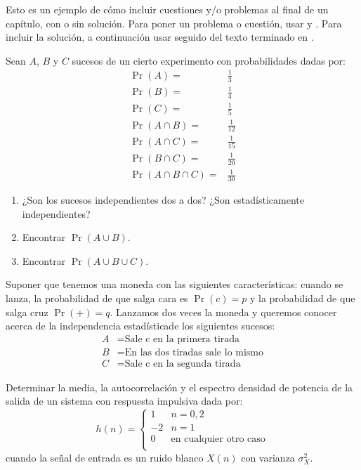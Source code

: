 \noindent Esto es un ejemplo de cómo incluir cuestiones y/o problemas al final de un capítulo, con o sin solución. Para poner un problema o cuestión, usar   y . Para incluir la solución, a continuación usar  seguido del texto terminado en .

\begin{prob}
Sean $A$, $B$ y $C$ sucesos de un cierto experimento con probabilidades dadas por:
\begin{align*}
\Pr\left( {A} \right)=&\frac{1}{3}\\
\Pr\left( {B} \right)=&\frac{1}{4}\\
\Pr\left( {C} \right)=&\frac{1}{5}\\
\Pr\left( {A\cap B} \right)=&\frac{1}{12}\\
\Pr\left( {A\cap C} \right)=&\frac{1}{15}\\
\Pr\left( {B\cap C} \right)=&\frac{1}{20}\\
\Pr\left( {A\cap B\cap C} \right)=&\frac{1}{30}
\end{align*}
\begin{enumerate}
\item ¿Son los sucesos independientes dos a dos? ¿Son estadísticamente independientes?
\item Encontrar $\Pr\left( {A\cup B} \right)$.
\item Encontrar $\Pr\left( {A\cup B\cup C} \right)$.
\end{enumerate}
\end{prob}

\begin{prob}
Suponer que tenemos una moneda con las siguientes características: cuando se lanza, la probabilidad de que salga cara es  $\Pr\left( {c} \right)=p$ y la probabilidad de que salga cruz $\Pr\left( {+} \right)=q$. Lanzamos dos veces la moneda y queremos conocer acerca de la independencia estadísticade los siguientes sucesos:
\begin{align*}
A& = \textrm{Sale c en la primera tirada}\\
B& = \textrm{En las dos tiradas sale lo mismo}\\
C& = \textrm{Sale c en la segunda tirada}
\end{align*}
\end{prob}

\begin{prob}
Determinar la media, la autocorrelación y el espectro densidad de potencia de la salida de un sistema con respuesta impulsiva dada por:
\begin{equation*}
h(n) = \begin{cases}
1 &n=0,2 \\
-2 &n=1  \\
0 & \text{en cualquier otro caso} \\
\end{cases}
\end{equation*}
cuando la señal de entrada es un ruido blanco $X(n)$ con varianza 
$\sigma_X^2$.
\end{prob}

